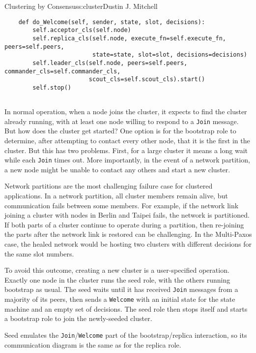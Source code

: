 \begin{aosachapter}{Clustering by Consensus}{s:cluster}{Dustin J. Mitchell}
\begin{verbatim}
    def do_Welcome(self, sender, state, slot, decisions):
        self.acceptor_cls(self.node)
        self.replica_cls(self.node, execute_fn=self.execute_fn, peers=self.peers,
                         state=state, slot=slot, decisions=decisions)
        self.leader_cls(self.node, peers=self.peers, commander_cls=self.commander_cls,
                        scout_cls=self.scout_cls).start()
        self.stop()
    
\end{verbatim}

\label{seed}

In normal operation, when a node joins the cluster, it expects to find
the cluster already running, with at least one node willing to respond
to a \texttt{Join} message. But how does the cluster get started? One
option is for the bootstrap role to determine, after attempting to
contact every other node, that it is the first in the cluster. But this
has two problems. First, for a large cluster it means a long wait while
each \texttt{Join} times out. More importantly, in the event of a
network partition, a new node might be unable to contact any others and
start a new cluster.

Network partitions are the most challenging failure case for clustered
applications. In a network partition, all cluster members remain alive,
but communication fails between some members. For example, if the
network link joining a cluster with nodes in Berlin and Taipei fails,
the network is partitioned. If both parts of a cluster continue to
operate during a partition, then re-joining the parts after the network
link is restored can be challenging. In the Multi-Paxos case, the healed
network would be hosting two clusters with different decisions for the
same slot numbers.

To avoid this outcome, creating a new cluster is a user-specified
operation. Exactly one node in the cluster runs the seed role, with the
others running bootstrap as usual. The seed waits until it has received
\texttt{Join} messages from a majority of its peers, then sends a
\texttt{Welcome} with an initial state for the state machine and an
empty set of decisions. The seed role then stops itself and starts a
bootstrap role to join the newly-seeded cluster.

Seed emulates the \texttt{Join}/\texttt{Welcome} part of the
bootstrap/replica interaction, so its communication diagram is the same
as for the replica role.

\begin{verbatim}


\end{verbatim}
\end{aosachapter}
